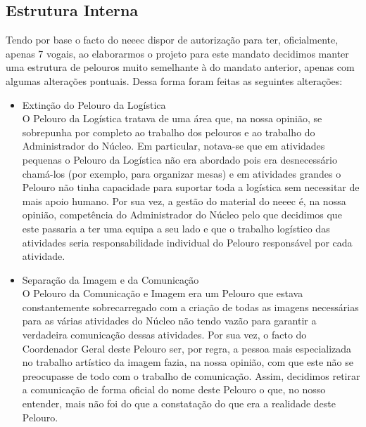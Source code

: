 
\subsection{Estrutura Interna}

Tendo por base o facto do \acrshort{neeec} dispor de autorização para ter, oficialmente, apenas 7 vogais, ao elaborarmos o projeto para este mandato decidimos manter uma estrutura de pelouros muito semelhante à do mandato anterior, apenas com algumas alterações pontuais. Dessa forma foram feitas as seguintes alterações:
\begin{itemize}
\item Extinção do Pelouro da Logística\\
O Pelouro da Logística tratava de uma área que, na nossa opinião, se sobrepunha por completo ao trabalho dos pelouros e ao trabalho do Administrador do Núcleo. Em particular, notava-se que em atividades pequenas o Pelouro da Logística não era abordado pois era desnecessário chamá-los (por exemplo, para organizar mesas) e em atividades grandes o Pelouro não tinha capacidade para suportar toda a logística sem necessitar de mais apoio humano. Por sua vez, a gestão do material do \acrshort{neeec} é, na nossa opinião, competência do Administrador do Núcleo pelo que decidimos que este passaria a ter uma equipa a seu lado e que o trabalho logístico das atividades seria responsabilidade individual do Pelouro responsável por cada atividade.

\item Separação da Imagem e da Comunicação\\
O Pelouro da Comunicação e Imagem era um Pelouro que estava constantemente sobrecarregado com a criação de todas as imagens necessárias para as várias atividades do Núcleo não tendo vazão para garantir a verdadeira comunicação dessas atividades. Por sua vez, o facto do Coordenador Geral deste Pelouro ser, por regra, a pessoa mais especializada no trabalho artístico da imagem fazia, na nossa opinião, com que este não se preocupasse de todo com o trabalho de comunicação. Assim, decidimos retirar a comunicação de forma oficial do nome deste Pelouro o que, no nosso entender, mais não foi do que a constatação do que era a realidade deste Pelouro.


\end{itemize}
